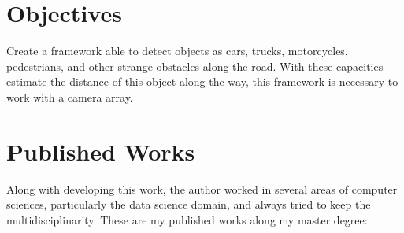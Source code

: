 \section{Objectives}

Create a framework able to detect objects as cars, trucks, motorcycles, pedestrians, and other strange obstacles along the road. With these capacities estimate the distance of this object along the way, this framework is necessary to work with a camera array.

\section{Published Works}

Along with developing this work, the author worked in several areas of computer sciences, particularly the data science domain, and always tried to keep the multidisciplinarity. These are my published works along my master degree:

